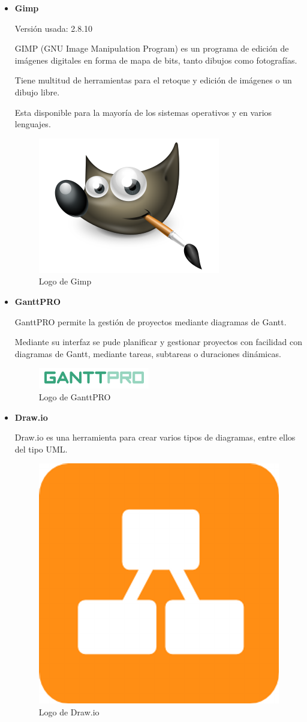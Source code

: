 \begin{itemize}
	\item \textbf{Gimp}
			
	Versión usada: 2.8.10
		
	GIMP (GNU Image Manipulation Program) \cite{gimp} es un programa de edición de imágenes digitales en forma de mapa de bits, tanto dibujos como fotografías. 

	Tiene multitud de herramientas para el retoque y edición de imágenes o un dibujo libre.

	Esta disponible para la mayoría de los sistemas operativos y en varios lenguajes.

	\bigskip
	\begin{figure}[h]
		\centering
		\includegraphics[width=0.3\linewidth]{../images/gimplogo}
		\caption[Logo de Gimp]{Logo de Gimp}
		\label{fig:gimplogo}
	\end{figure}
	
	
	\item \textbf{GanttPRO}
	
	GanttPRO \cite{ganttpro} permite la gestión de proyectos mediante diagramas de Gantt.

	Mediante su interfaz se pude planificar y gestionar proyectos con facilidad con diagramas de Gantt, mediante tareas, subtareas o duraciones dinámicas. 	

	\bigskip
	\begin{figure}[h]
		\centering
		\includegraphics[width=0.3\linewidth]{../images/ganttprologo}
		\caption[Logo de GanttPRO]{Logo de GanttPRO}
		\label{fig:ganttprologo}
	\end{figure}

	\item \textbf{Draw.io}
	
	Draw.io \cite{drawioweb} es una herramienta para crear varios tipos de diagramas, entre ellos del tipo UML.
	
	\bigskip
	\begin{figure}[h]
		\centering
		\includegraphics[width=0.3\linewidth]{../images/drawiologo}
		\caption[Logo de Draw.io]{Logo de Draw.io}
		\label{fig:drawiologo}
	\end{figure}
					
\end{itemize}

